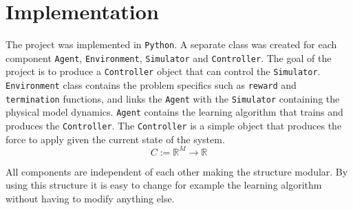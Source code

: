\documentclass{LTHtwocol} %
\begin{document}






%

\section{Implementation}
The project was implemented in \texttt{Python}.
A separate class was created for each component \texttt{Agent}, \texttt{Environment}, \texttt{Simulator} and \texttt{Controller}.
The goal of the project is to produce a \texttt{Controller} object that can control the \texttt{Simulator}.
\texttt{Environment} class contains the problem specifics such as \texttt{reward} and \texttt{termination} functions, and links the \texttt{Agent} with the \texttt{Simulator} containing the physical model dynamics.
\texttt{Agent} contains the learning algorithm that trains and produces the \texttt{Controller}.
The \texttt{Controller} is a simple object that produces the force to apply given the current state of the system.
\begin{equation}
	C := \mathbb{R}^M \to \mathbb{R}
\end{equation}

All components are independent of each other making the structure modular.
By using this structure it is easy to change for example the learning algorithm without having to modify anything else.
\end{document}
